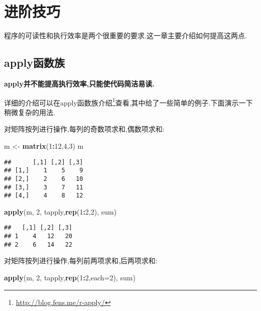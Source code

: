 \documentclass[]{ctexbook}
\newenvironment{Shaded}{\begin{snugshade}}{\end{snugshade}}
\newcommand{\DataTypeTok}[1]{\textcolor[rgb]{0.13,0.29,0.53}{#1}}
\newcommand{\DecValTok}[1]{\textcolor[rgb]{0.00,0.00,0.81}{#1}}
\newcommand{\KeywordTok}[1]{\textcolor[rgb]{0.13,0.29,0.53}{\textbf{#1}}}
\newcommand{\NormalTok}[1]{#1}
\newcommand{\OperatorTok}[1]{\textcolor[rgb]{0.81,0.36,0.00}{\textbf{#1}}}
\newcommand{\StringTok}[1]{\textcolor[rgb]{0.31,0.60,0.02}{#1}}
\renewcommand{\href}[2]{#2\footnote{\url{#1}}}
\begin{document}
\hypertarget{section-11}{%
\chapter{进阶技巧}\label{section-11}}

程序的可读性和执行效率是两个很重要的要求.这一章主要介绍如何提高这两点.

\hypertarget{apply}{%
\section{apply函数族}\label{apply}}

\textbf{apply并不能提高执行效率,只能使代码简洁易读.}

详细的介绍可以在\href{http://blog.fens.me/r-apply/}{apply函数族介绍}查看,其中给了一些简单的例子.下面演示一下稍微复杂的用法.

对矩阵按列进行操作,每列的奇数项求和,偶数项求和:

\begin{Shaded}
\begin{Highlighting}[]
\NormalTok{m <-}\StringTok{ }\KeywordTok{matrix}\NormalTok{(}\DecValTok{1}\OperatorTok{:}\DecValTok{12}\NormalTok{,}\DecValTok{4}\NormalTok{,}\DecValTok{3}\NormalTok{)}
\NormalTok{m}
\end{Highlighting}
\end{Shaded}

\begin{verbatim}
##      [,1] [,2] [,3]
## [1,]    1    5    9
## [2,]    2    6   10
## [3,]    3    7   11
## [4,]    4    8   12
\end{verbatim}

\begin{Shaded}
\begin{Highlighting}[]
\KeywordTok{apply}\NormalTok{(m, }\DecValTok{2}\NormalTok{, tapply,}\KeywordTok{rep}\NormalTok{(}\DecValTok{1}\OperatorTok{:}\DecValTok{2}\NormalTok{,}\DecValTok{2}\NormalTok{), sum)}
\end{Highlighting}
\end{Shaded}

\begin{verbatim}
##   [,1] [,2] [,3]
## 1    4   12   20
## 2    6   14   22
\end{verbatim}

对矩阵按列进行操作,每列前两项求和,后两项求和:

\begin{Shaded}
\begin{Highlighting}[]
\KeywordTok{apply}\NormalTok{(m, }\DecValTok{2}\NormalTok{, tapply,}\KeywordTok{rep}\NormalTok{(}\DecValTok{1}\OperatorTok{:}\DecValTok{2}\NormalTok{,}\DataTypeTok{each=}\DecValTok{2}\NormalTok{), sum)}
\end{Highlighting}
\end{Shaded}
\end{document}
